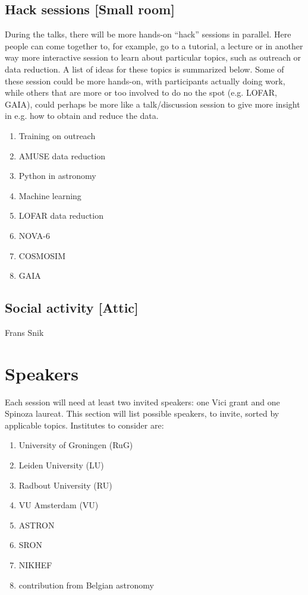 \documentclass{article}
\begin{document}
\subsection{Hack sessions [Small room]}

During the talks, there will be more hands-on ``hack'' sessions in
parallel. Here people can come together to, for example, go to a
tutorial, a lecture or in another way more interactive session to
learn about particular topics, such as outreach or data reduction. A
list of ideas for these topics is summarized below. Some of these
session could be more hands-on, with participants actually doing work,
while others that are more or too involved to do no the spot
(e.g. LOFAR, GAIA), could perhaps be more like a talk/discussion
session to give more insight in e.g. how to obtain and reduce the
data.

\begin{multicols}{2}
    \begin{enumerate}
        \item Training on outreach
        \item AMUSE data reduction
        \item Python in astronomy
        \item Machine learning
        \item LOFAR data reduction
        \item NOVA-6
        \item COSMOSIM
        \item GAIA
    \end{enumerate}
\end{multicols}

\subsection{Social activity [Attic]}

Frans Snik

\section{Speakers}

Each session will need at least two invited speakers: one Vici grant
and one Spinoza laureat. This section will list possible speakers, to
invite, sorted by applicable topics. Institutes to consider are:

\begin{multicols}{2}
    \begin{enumerate}
        \item University of Groningen (RuG)
        \item Leiden University (LU)
        \item Radbout University (RU)
        \item VU Amsterdam (VU)
        \item ASTRON
        \item SRON
        \item NIKHEF
        \item contribution from Belgian astronomy
    \end{enumerate}
\end{multicols}
\end{document}
